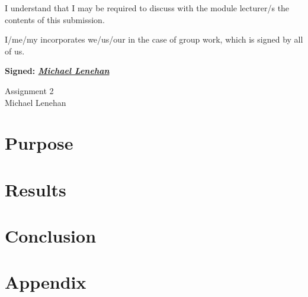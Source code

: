 \documentclass[12pt,a4paper]{scrartcl}
\begin{document}
\begin{titlepage}
\begin{bfseries}
    I understand that I may be required to discuss with
    the module lecturer/s the contents of this submission.
    
    I/me/my incorporates
    we/us/our in the case of group work, which is signed by all of us.
    \end{bfseries}

    \textbf{Signed: \underline{\textit{Michael Lenehan}}}
    
\end{titlepage}

\begin{center}
  \hfill \break%
  \Huge{Assignment 2}\\[0.5em]
  \Large{Michael Lenehan}\\[2.5em]
\end{center}

\section{Purpose}\label{purpose}

\section{Results}\label{results}

\section{Conclusion}\label{conclusion}

\section{Appendix}\label{appendix}
\end{document}
